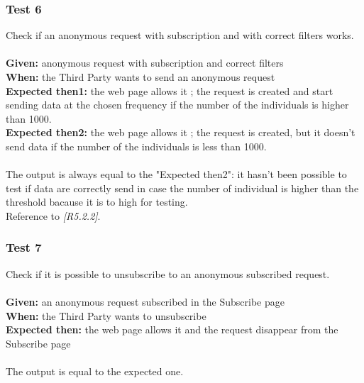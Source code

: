 \subsubsection{\Large{Test 6}}
Check if an anonymous request with subscription and with correct filters works.\\
\\
\textbf{Given: } anonymous request with subscription and correct filters\\
\textbf{When: } the Third Party wants to send an anonymous request\\
\textbf{Expected then1: }the web page allows it ; the request is created and start sending data at the chosen frequency if the number of the individuals is higher than 1000.\\
\textbf{Expected then2: }the web page allows it ; the request is created, but it doesn't send data if the number of the individuals is less than 1000.\\
\\
The output is always equal to the "Expected then2": it hasn't been possible to test if data are correctly send in case the number of individual is higher than the threshold bacause it is to high for testing.\\
Reference to \textit{[R5.2.2]}.

\subsubsection{\Large{Test 7}}
Check if it is possible to unsubscribe to an anonymous subscribed request.\\
\\
\textbf{Given: } an anonymous request subscribed in the Subscribe page \\
\textbf{When: } the Third Party wants to unsubscribe\\
\textbf{Expected then: } the web page allows it and the request disappear from the Subscribe page\\
\\
The output is equal to the expected one.

